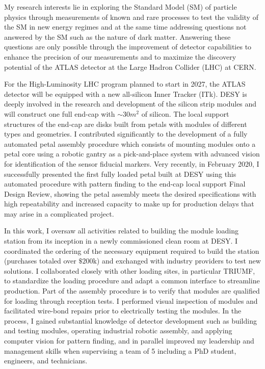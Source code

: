 \documentclass[a4paper]{article}
\begin{document}
\thispagestyle{fancy} 
 \lfoot{} \rfoot{\bf \thepage} \cfoot{}

\fontsize{11}{14}
\selectfont

My research interests lie in exploring the Standard Model (SM) of particle physics through measurements of known and rare processes
to test the validity of the SM in new energy regimes and at the same time addressing questions not answered by the SM such as the nature of dark matter. Answering these questions are only possible through the improvement of detector capabilities to enhance the precision of our
measurements and to maximize the discovery potential of the ATLAS detector at the Large Hadron Collider (LHC) at CERN.

For the High-Luminosity LHC program planned to start in 2027, the ATLAS detector will be equipped with a new all-silicon Inner Tracker (ITk). DESY is deeply involved in the research and development of the silicon strip modules and will construct one full end-cap with $\sim 30 m^2$ of silicon.
The local support structures of the end-cap are disks built from petals with modules of different types and geometries.
I contributed significantly to the development of a fully automated petal assembly procedure which consists of mounting modules onto a petal core using a robotic gantry as a pick-and-place system with advanced vision for identification of the sensor fiducial markers.
Very recently, in February 2020, I successfully presented the first fully loaded petal built at DESY using this automated procedure with pattern finding to the end-cap local support Final Design Review, showing the petal assembly meets the desired specifications with high repeatability and increased capacity to make up for production delays that may arise in a complicated project.

In this work, I oversaw all activities related to building the module loading station from its inception in a newly commissioned clean room at DESY. I coordinated the ordering of the necessary equipment required to build the station (purchases totaled over $\$200$k) and exchanged with industry providers to test new solutions. I collaborated closely with other loading sites, in particular TRIUMF, to standardize the loading procedure and adapt a common interface to streamline production. Part of the assembly procedure is to verify that modules are qualified for loading through reception tests. I performed visual inspection of modules and facilitated wire-bond repairs prior to electrically testing the modules.
In the process, I gained substantial knowledge of detector development such as building and testing modules, operating industrial robotic assembly, and applying computer vision for pattern finding, and in parallel improved my leadership and management skills when supervising a team of 5 including a PhD student, engineers, and technicians.
\end{document}
